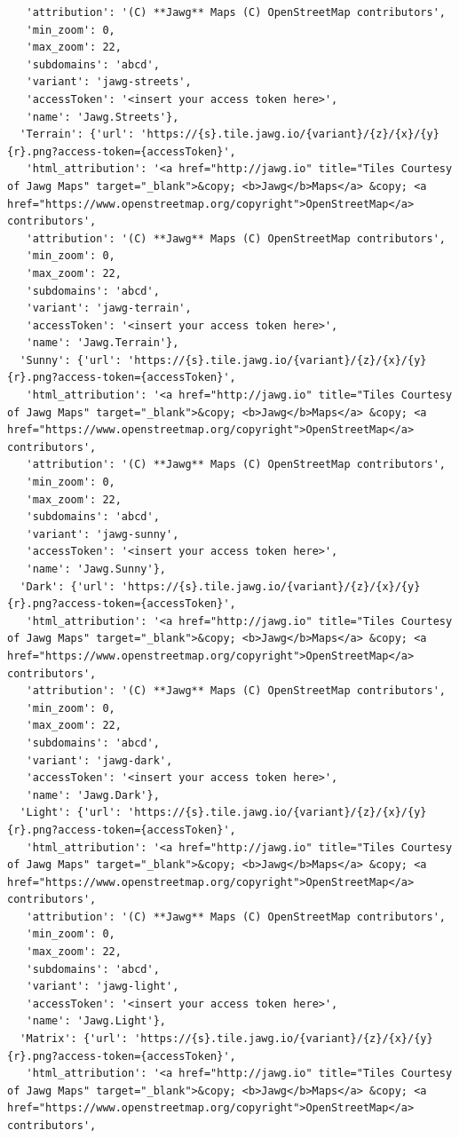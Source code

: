 \documentclass[
  letterpaper,
  DIV=11,
  numbers=noendperiod]{scrreprt}
\begin{document}
\begin{verbatim}
   'attribution': '(C) **Jawg** Maps (C) OpenStreetMap contributors',
   'min_zoom': 0,
   'max_zoom': 22,
   'subdomains': 'abcd',
   'variant': 'jawg-streets',
   'accessToken': '<insert your access token here>',
   'name': 'Jawg.Streets'},
  'Terrain': {'url': 'https://{s}.tile.jawg.io/{variant}/{z}/{x}/{y}{r}.png?access-token={accessToken}',
   'html_attribution': '<a href="http://jawg.io" title="Tiles Courtesy of Jawg Maps" target="_blank">&copy; <b>Jawg</b>Maps</a> &copy; <a href="https://www.openstreetmap.org/copyright">OpenStreetMap</a> contributors',
   'attribution': '(C) **Jawg** Maps (C) OpenStreetMap contributors',
   'min_zoom': 0,
   'max_zoom': 22,
   'subdomains': 'abcd',
   'variant': 'jawg-terrain',
   'accessToken': '<insert your access token here>',
   'name': 'Jawg.Terrain'},
  'Sunny': {'url': 'https://{s}.tile.jawg.io/{variant}/{z}/{x}/{y}{r}.png?access-token={accessToken}',
   'html_attribution': '<a href="http://jawg.io" title="Tiles Courtesy of Jawg Maps" target="_blank">&copy; <b>Jawg</b>Maps</a> &copy; <a href="https://www.openstreetmap.org/copyright">OpenStreetMap</a> contributors',
   'attribution': '(C) **Jawg** Maps (C) OpenStreetMap contributors',
   'min_zoom': 0,
   'max_zoom': 22,
   'subdomains': 'abcd',
   'variant': 'jawg-sunny',
   'accessToken': '<insert your access token here>',
   'name': 'Jawg.Sunny'},
  'Dark': {'url': 'https://{s}.tile.jawg.io/{variant}/{z}/{x}/{y}{r}.png?access-token={accessToken}',
   'html_attribution': '<a href="http://jawg.io" title="Tiles Courtesy of Jawg Maps" target="_blank">&copy; <b>Jawg</b>Maps</a> &copy; <a href="https://www.openstreetmap.org/copyright">OpenStreetMap</a> contributors',
   'attribution': '(C) **Jawg** Maps (C) OpenStreetMap contributors',
   'min_zoom': 0,
   'max_zoom': 22,
   'subdomains': 'abcd',
   'variant': 'jawg-dark',
   'accessToken': '<insert your access token here>',
   'name': 'Jawg.Dark'},
  'Light': {'url': 'https://{s}.tile.jawg.io/{variant}/{z}/{x}/{y}{r}.png?access-token={accessToken}',
   'html_attribution': '<a href="http://jawg.io" title="Tiles Courtesy of Jawg Maps" target="_blank">&copy; <b>Jawg</b>Maps</a> &copy; <a href="https://www.openstreetmap.org/copyright">OpenStreetMap</a> contributors',
   'attribution': '(C) **Jawg** Maps (C) OpenStreetMap contributors',
   'min_zoom': 0,
   'max_zoom': 22,
   'subdomains': 'abcd',
   'variant': 'jawg-light',
   'accessToken': '<insert your access token here>',
   'name': 'Jawg.Light'},
  'Matrix': {'url': 'https://{s}.tile.jawg.io/{variant}/{z}/{x}/{y}{r}.png?access-token={accessToken}',
   'html_attribution': '<a href="http://jawg.io" title="Tiles Courtesy of Jawg Maps" target="_blank">&copy; <b>Jawg</b>Maps</a> &copy; <a href="https://www.openstreetmap.org/copyright">OpenStreetMap</a> contributors',

\end{verbatim}
\end{document}
